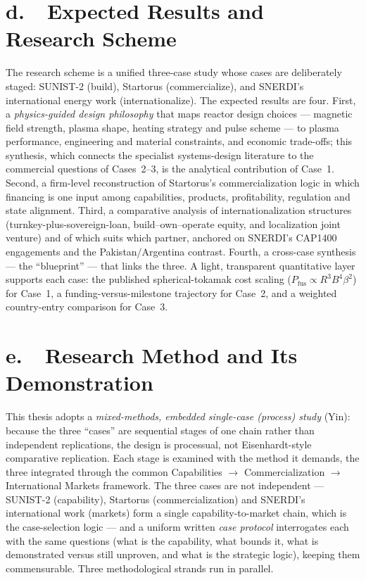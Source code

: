 \documentclass[11pt]{article}
\begin{document}
\section*{d.~~Expected Results and Research Scheme}
The research scheme is a unified three-case study whose cases are deliberately staged: SUNIST-2 (build), Startorus (commercialize), and SNERDI's international energy work (internationalize). The expected results are four. First, a \emph{physics-guided design philosophy} that maps reactor design choices --- magnetic field strength, plasma shape, heating strategy and pulse scheme --- to plasma performance, engineering and material constraints, and economic trade-offs; this synthesis, which connects the specialist systems-design literature\cite{process2020} to the commercial questions of Cases~2--3, is the analytical contribution of Case~1. Second, a firm-level reconstruction of Startorus's commercialization logic in which financing is one input among capabilities, products, profitability, regulation and state alignment. Third, a comparative analysis of internationalization structures (turnkey-plus-sovereign-loan, build--own--operate equity, and localization joint venture) and of which suits which partner, anchored on SNERDI's CAP1400 engagements and the Pakistan/Argentina contrast. Fourth, a cross-case synthesis --- the ``blueprint'' --- that links the three. A light, transparent quantitative layer supports each case: the published spherical-tokamak cost scaling ($P_{\mathrm{fus}}\propto R^{3}B^{4}\beta^{2}$) for Case~1, a funding-versus-milestone trajectory for Case~2, and a weighted country-entry comparison for Case~3.

\section*{e.~~Research Method and Its Demonstration}
This thesis adopts a \emph{mixed-methods, embedded single-case (process) study} (Yin\cite{yin2018}): because the three ``cases'' are sequential stages of one chain rather than independent replications, the design is processual, not Eisenhardt-style comparative replication\cite{eisenhardt1989}. Each stage is examined with the method it demands, the three integrated through the common Capabilities $\rightarrow$ Commercialization $\rightarrow$ International Markets framework. The three cases are not independent --- SUNIST-2 (capability), Startorus (commercialization) and SNERDI's international work (markets) form a single capability-to-market chain, which is the case-selection logic --- and a uniform written \emph{case protocol} interrogates each with the same questions (what is the capability, what bounds it, what is demonstrated versus still unproven, and what is the strategic logic), keeping them commensurable. Three methodological strands run in parallel.
\end{document}
